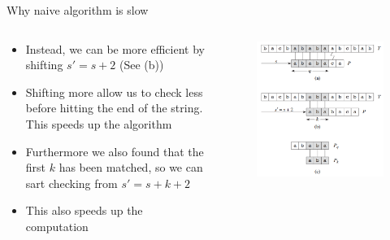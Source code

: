\documentclass[10pt,xcolor={table,dvipsnames},t]{beamer}
\begin{document}
\begin{frame}{Why naive algorithm is slow}
  \begin{columns}
    \begin{column}{0.55\textwidth}
      \begin{itemize}
        \item Instead, we can be more efficient by shifting $s'=s+2$ (See (b))
        \item Shifting more allow us to check less before hitting the end of the string. This speeds up the algorithm
        \item Furthermore we also found that the first $k$ has been matched, so we can sart checking from $s'=s+k+2$
        \item This also speeds up the computation
      \end{itemize}
    \end{column}
    \begin{column}{0.45\textwidth}
      \begin{figure}
        \includegraphics[width=\textwidth]{img/kmp-why-naive-slow.PNG}
      \end{figure}
    \end{column}
  \end{columns}
\end{frame}
\end{document}
